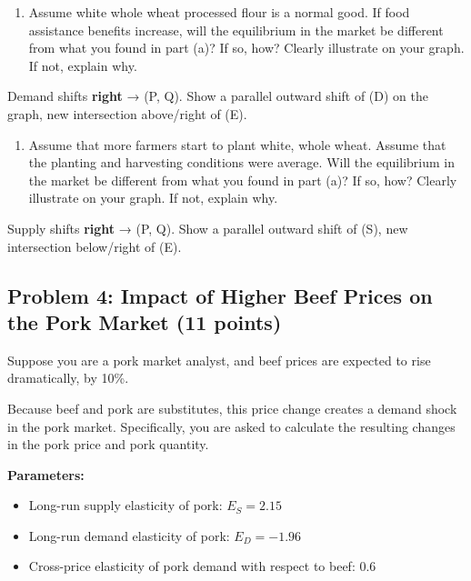 \documentclass[
  letterpaper,
  DIV=11,
  numbers=noendperiod]{scrartcl}
\providecommand{\tightlist}{%
  \setlength{\itemsep}{0pt}\setlength{\parskip}{0pt}}
\begin{document}
\begin{enumerate}
\def\labelenumi{\alph{enumi}.}
\setcounter{enumi}{1}
\tightlist
\item
  Assume white whole wheat processed flour is a normal good. If food
  assistance benefits increase, will the equilibrium in the market be
  different from what you found in part (a)? If so, how? Clearly
  illustrate on your graph. If not, explain why.
\end{enumerate}

Demand shifts \textbf{right} → (P\uparrow, Q\uparrow). Show a parallel
outward shift of (D) on the graph, new intersection above/right of (E).

\begin{enumerate}
\def\labelenumi{\alph{enumi}.}
\setcounter{enumi}{2}
\tightlist
\item
  Assume that more farmers start to plant white, whole wheat. Assume
  that the planting and harvesting conditions were average. Will the
  equilibrium in the market be different from what you found in part
  (a)? If so, how? Clearly illustrate on your graph. If not, explain
  why.
\end{enumerate}

Supply shifts \textbf{right} → (P\downarrow, Q\uparrow). Show a parallel
outward shift of (S), new intersection below/right of (E).

\subsection{Problem 4: Impact of Higher Beef Prices on the Pork Market
(11
points)}\label{problem-4-impact-of-higher-beef-prices-on-the-pork-market-11-points}

Suppose you are a pork market analyst, and beef prices are expected to
rise dramatically, by 10\%.

Because beef and pork are substitutes, this price change creates a
demand shock in the pork market. Specifically, you are asked to
calculate the resulting changes in the pork price and pork quantity.

\textbf{Parameters:}

\begin{itemize}
\tightlist
\item
  Long-run supply elasticity of pork: \(E_S = 2.15\)\\
\item
  Long-run demand elasticity of pork: \(E_D = -1.96\)\\
\item
  Cross-price elasticity of pork demand with respect to beef: \(0.6\)
\end{itemize}
\end{document}
